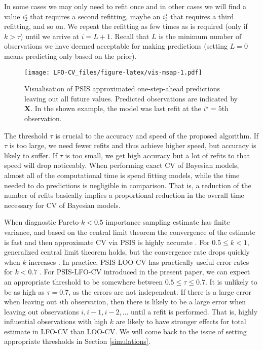 \documentclass[american,]{article}
\begin{document}
In some cases we may only need to refit once and in other cases we will find a
value \(i^\star_2\) that requires a second refitting, maybe an \(i^\star_3\) that
requires a third refitting, and so on. We repeat the refitting as few times as
is required (only if \(k > \tau\)) until we arrive at \(i = L + 1\). Recall that \(L\)
is the minimum number of observations we have deemed acceptable for making
predictions (setting \(L=0\) means predicting only based on the prior).

\begin{figure}
\centering
\texttt{[image: LFO-CV\_files/figure-latex/vis-msap-1.pdf]}
\caption{\label{fig:vis-msap}Visualisation of PSIS approximated one-step-ahead predictions leaving out all future values. Predicted observations are indicated by \textbf{X}. In the shown example, the model was last refit at the \(i^\star = 5\)th observation.}
\end{figure}

The threshold \(\tau\) is crucial to the accuracy and speed of the proposed
algorithm. If \(\tau\) is too large, we need fewer refits and thus achieve higher
speed, but accuracy is likely to suffer. If \(\tau\) is too small, we get high
accuracy but a lot of refits to that speed will drop noticeably. When performing
exact CV of Bayesian models, almost all of the computational time is spend
fitting models, while the time needed to do predictions is negligible in
comparison. That is, a reduction of the number of refits basically implies a
proportional reduction in the overall time necessary for CV of Bayesian models.

When diagnostic Pareto-\(k<0.5\) importance sampling estimate has finite variance, and based on the central limit theorem the convergence of the estimate is fast and then approximate CV via PSIS is highly accurate
\citep{vehtari2017psis}. For \(0.5 \leq k < 1\), generalized central limit theorem holds, but the convergence rate drops quickly when $k$ increases \citep{vehtari2017psis}. In practice, PSIS-LOO-CV has practically useful error rates for
\(k < 0.7\) \citep{vehtari2017loo}. For PSIS-LFO-CV introduced in the
present paper, we can expect an appropriate threshold to be somewhere between
\(0.5 \leq \tau \leq 0.7\). It is unlikely to be as high as \(\tau = 0.7\), as the
errors are not independent. If there is a large error when leaving out \(i\)th observation, then there is likely to be a large error when leaving out observations \(i, i-1, i-2, \ldots\) until a refit is performed. That
is, highly influential observations with high \(k\) are likely to have stronger effects
for total estimate in LFO-CV than LOO-CV. We will come back to the issue of setting appropriate
thresholds in Section \ref{simulations}.
\end{document}
